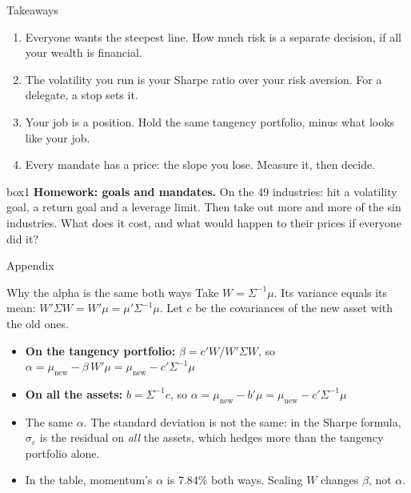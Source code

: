 \documentclass[aspectratio=169,10pt]{beamer}
\begin{document}
\begin{frame}{Takeaways}
\begin{enumerate}
\item Everyone wants the steepest line. How much risk is a separate decision, if all your wealth is financial.
\vskip 6pt
\item The volatility you run is your Sharpe ratio over your risk aversion. For a delegate, a stop sets it.
\vskip 6pt
\item Your job is a position. Hold the same tangency portfolio, minus what looks like your job.
\vskip 6pt
\item Every mandate has a price: the slope you lose. Measure it, then decide.
\end{enumerate}
\vskip 14pt
\begin{beamercolorbox}[rounded=true,sep=7pt]{box1}
\textbf{Homework: goals and mandates.} On the 49 industries: hit a volatility goal, a return goal and a leverage limit. Then take out more and more of the sin industries. What does it cost, and what would happen to their prices if everyone did it?
\end{beamercolorbox}
\end{frame}

\appendix
\begin{frame}
\begin{center}
{\Large Appendix}
\end{center}
\end{frame}

\begin{frame}[label=appendix_span]{Why the alpha is the same both ways}
Take $W = \Sigma^{-1}\mu$. Its variance equals its mean: $W'\Sigma W = W'\mu = \mu'\Sigma^{-1}\mu$. Let $c$ be the covariances of the new asset with the old ones.
\vskip 8pt
\begin{itemize}
\item \textbf{On the tangency portfolio:} $\beta = c'W / W'\Sigma W$, so $\alpha = \mu_{\text{new}} - \beta\, W'\mu = \mu_{\text{new}} - c'\Sigma^{-1}\mu$
\vskip 6pt
\item \textbf{On all the assets:} $b = \Sigma^{-1}c$, so $\alpha = \mu_{\text{new}} - b'\mu = \mu_{\text{new}} - c'\Sigma^{-1}\mu$
\vskip 6pt
\item The same $\alpha$. The standard deviation is not the same: in the Sharpe formula, $\sigma_{\varepsilon}$ is the residual on \emph{all} the assets, which hedges more than the tangency portfolio alone.
\vskip 6pt
\item In the table, momentum's $\alpha$ is 7.84\% both ways. Scaling $W$ changes $\beta$, not $\alpha$.
\end{itemize}
\vskip 4pt
\hfill \hyperlink{span}{}
\end{frame}
\end{document}
